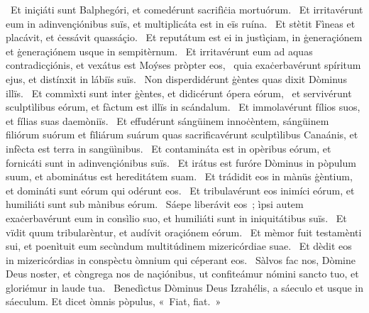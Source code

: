{~Et iniçiáti sunt Balphegóri, et comedérunt sacrifìċia mortuórum. 
~Et irritavérunt eum in adinvençiónibus suïs, et multiplicáta est in eïs ruína. 
~Et stètit Fìneas et placávit, et ċessávit quassáçio. 
~Et reputátum est ei in justìçiam, in ġeneraçiónem et ġeneraçiónem usque in sempitèrnum. 
~Et irritavérunt eum ad aquas contradicçiónis, et vexátus est Moýses pròpter eos, 
~quia exaċerbavérunt spíritum ejus, et distínxit in lábiïs suïs. 
~Non disperdidérunt ġèntes quas dixit Dòminus illïs. 
~Et commìxti sunt inter ġèntes, et didicérunt ópera eórum, 
~et servivérunt sculptìlibus eórum, et fàctum est illïs in scándalum. 
~Et immolavérunt fílios suos, et fílias suas daemòniïs. 
~Et effudérunt sángüinem innoċèntem, sángüinem filiórum suórum et fïliárum suárum quas sacrificavérunt sculptìlibus Canaánis, et infècta est terra in sangüìnibus. 
~Et contamináta est in opèribus eórum, et fornicáti sunt in adinvençiónibus suïs. 
~Et irátus est furóre Dòminus in pòpulum suum, et abominátus est hereditátem suam. 
~Et trádidit eos in mànüs ġèntium, et domináti sunt eórum qui odérunt eos. 
~Et tribulavérunt eos inimíci eórum, et humiliáti sunt sub mànibus eórum. 
~Sáepe liberávit eos~; ìpsi autem exaċerbavérunt eum in consìlio suo, et humiliáti sunt in iniquitátibus suïs. 
~Et vïdit quum tribularèntur, et audívit oraçiónem eórum. 
~Et mèmor fuit testamènti sui, et poenìtuit eum secùndum multitúdinem mizericórdiae suae. 
~Et dèdit eos in mizericórdias in conspèctu òmnium qui céperant eos. 
~Sàlvos fac nos, Dòmine Deus noster, et còngrega nos de naçiónibus, ut confiteámur nómini sancto tuo, et gloriémur in laude tua. 
~Benedìctus Dòminus Deus Izrahélis, a sáeculo et usque in sáeculum. Et dicet òmnis pòpulus, «~Fiat, fiat.~» 
}
